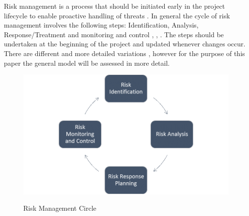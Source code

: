 Risk management is a process that should be initiated early in the project lifecycle to enable proactive handling of threats \cite{islamSoftwareDevelopmentRisk2011}. In general the cycle of risk management involves the following steps: Identification, Analysis, Response/Treatment and monitoring and control \cite{islamSoftwareDevelopmentRisk2011}, \cite{teschITProjectRisk2007}, \cite{didragaRoleEffectsRisk2013}. The steps should be undertaken at the beginning of the project and updated whenever changes occur. There are different and more detailed variations \cite{teschITProjectRisk2007}, however for the purpose of this paper the general model will be assessed in more detail. \\

\begin{figure}[htbp] 
	\centering
	\includegraphics[width=1.0\textwidth]{Content/Theory/RiskManagementCycle.png}
	\caption{Risk Management Circle}
	\cite{own representation}
	\label{fig:riskmanagmentcycle}
\end{figure}

